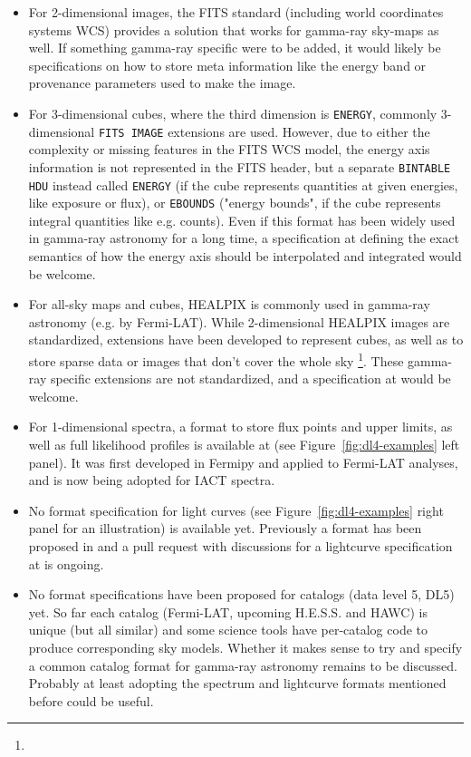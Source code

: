 \begin{itemize}
\item{} For 2-dimensional images, the FITS standard (including world coordinates systems WCS) provides a solution that works for gamma-ray sky-maps as well. If something gamma-ray specific were to be added, it would likely be specifications on how to store meta information like the energy band  or provenance parameters used to make the image.
\item{} For 3-dimensional cubes, where the third dimension is \texttt{ENERGY}, commonly 3-dimensional \texttt{FITS IMAGE} extensions are used. However, due to either the complexity or missing features in the FITS WCS model, the energy axis information is not represented in the FITS header, but a separate \texttt{BINTABLE HDU} instead called \texttt{ENERGY} (if the cube represents quantities at given energies, like exposure or flux), or \texttt{EBOUNDS} ("energy bounds", if the cube represents integral quantities like e.g. counts).
Even if this format has been widely used in gamma-ray astronomy for a long time, a specification at \gadf defining the exact semantics of how the energy axis should be interpolated and integrated would be welcome.
\item{} For all-sky maps and cubes, HEALPIX is commonly used in gamma-ray astronomy (e.g. by Fermi-LAT). While 2-dimensional HEALPIX images are standardized, extensions have been developed to represent cubes, as well as to store sparse data or images that don't cover the whole sky \footnote{\pointlikedata}. These gamma-ray specific extensions are not standardized, and a specification at \gadf would be welcome.
\item{} For 1-dimensional spectra, a format to store flux points and upper limits, as well as full likelihood profiles is available at \gadf (see Figure~\ref{fig:dl4-examples} left panel). It was first developed in Fermipy and applied to Fermi-LAT analyses, and is now being adopted for IACT spectra.
\item{} No format specification for light curves (see Figure~\ref{fig:dl4-examples} right panel for an illustration) is available yet. Previously a format has been proposed in \cite{2010AnA...524A..48T} and a pull request with discussions for a lightcurve specification at \gadf is ongoing.
\item{} No format specifications have been proposed for catalogs (data level 5, DL5) yet. So far each catalog (Fermi-LAT, upcoming H.E.S.S. and HAWC) is unique (but all similar) and some science tools have per-catalog code to produce corresponding sky models. Whether it makes sense to try and specify a common catalog format for gamma-ray astronomy remains to be discussed. Probably at least adopting the spectrum and lightcurve formats mentioned before could be useful.
\end{itemize}

